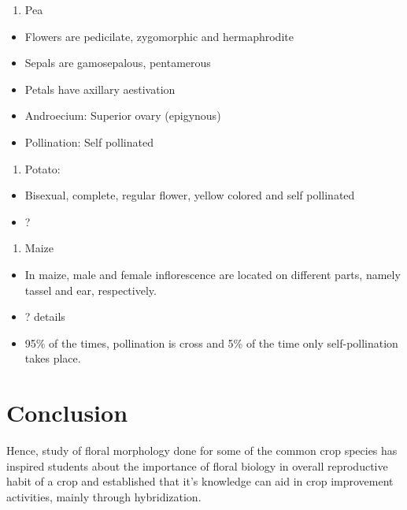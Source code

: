 \documentclass[]{book}
\providecommand{\tightlist}{%
  \setlength{\itemsep}{0pt}\setlength{\parskip}{0pt}}
\begin{document}
\begin{enumerate}
\def\labelenumi{\arabic{enumi}.}
\setcounter{enumi}{1}
\tightlist
\item
  Pea
\end{enumerate}

\begin{itemize}
\tightlist
\item
  Flowers are pedicilate, zygomorphic and hermaphrodite
\item
  Sepals are gamosepalous, pentamerous
\item
  Petals have axillary aestivation
\item
  Androecium: Superior ovary (epigynous)
\item
  Pollination: Self pollinated
\end{itemize}

\begin{enumerate}
\def\labelenumi{\arabic{enumi}.}
\setcounter{enumi}{2}
\tightlist
\item
  Potato:
\end{enumerate}

\begin{itemize}
\tightlist
\item
  Bisexual, complete, regular flower, yellow colored and self pollinated
\item
  ?
\end{itemize}

\begin{enumerate}
\def\labelenumi{\arabic{enumi}.}
\setcounter{enumi}{3}
\tightlist
\item
  Maize
\end{enumerate}

\begin{itemize}
\item
  In maize, male and female inflorescence are located on different parts, namely tassel and ear, respectively.
\item
  ? details
\item
  95\% of the times, pollination is cross and 5\% of the time only self-pollination takes place.
\end{itemize}

\hypertarget{conclusion}{%
\section{Conclusion}\label{conclusion}}

Hence, study of floral morphology done for some of the common crop species has inspired students about the importance of floral biology in overall reproductive habit of a crop and established that it's knowledge can aid in crop improvement activities, mainly through hybridization.
\end{document}
